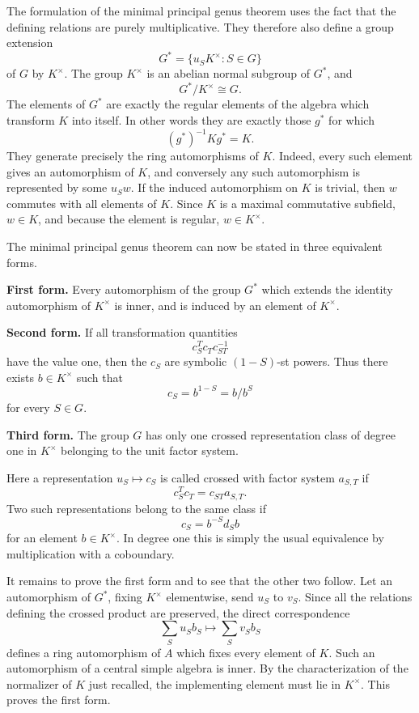 \documentclass[11pt]{article}
\begin{document}
The formulation of the minimal principal genus theorem uses the fact that the defining relations are purely multiplicative. They therefore also define a group extension
\[
  G^*=\{u_S K^{\times}: S\in G\}
\]
of \(G\) by \(K^{\times}\). The group \(K^{\times}\) is an abelian normal subgroup of \(G^*\), and
\[
  G^*/K^{\times}\cong G.
\]
The elements of \(G^*\) are exactly the regular elements of the algebra which transform \(K\) into itself. In other words they are exactly those \(g^*\) for which
\[
  (g^*)^{-1}Kg^*=K.
\]
They generate precisely the ring automorphisms of \(K\). Indeed, every such element gives an automorphism of \(K\), and conversely any such automorphism is represented by some \(u_S w\). If the induced automorphism on \(K\) is trivial, then \(w\) commutes with all elements of \(K\). Since \(K\) is a maximal commutative subfield, \(w\in K\), and because the element is regular, \(w\in K^{\times}\).

The minimal principal genus theorem can now be stated in three equivalent forms.

\textbf{First form.} Every automorphism of the group \(G^*\) which extends the identity automorphism of \(K^{\times}\) is inner, and is induced by an element of \(K^{\times}\).

\textbf{Second form.} If all transformation quantities
\[
  c_S^T c_T c_{ST}^{-1}
\]
have the value one, then the \(c_S\) are symbolic \((1-S)\)-st powers. Thus there exists \(b\in K^{\times}\) such that
\[
  c_S=b^{1-S}=b/b^S
\]
for every \(S\in G\).

\textbf{Third form.} The group \(G\) has only one crossed representation class of degree one in \(K^{\times}\) belonging to the unit factor system.

Here a representation \(u_S\mapsto c_S\) is called crossed with factor system \(a_{S,T}\) if
\[
  c_S^T c_T=c_{ST}a_{S,T}.
\]
Two such representations belong to the same class if
\[
  c_S=b^{-S}d_S b
\]
for an element \(b\in K^{\times}\). In degree one this is simply the usual equivalence by multiplication with a coboundary.

It remains to prove the first form and to see that the other two follow. Let an automorphism of \(G^*\), fixing \(K^{\times}\) elementwise, send \(u_S\) to \(v_S\). Since all the relations defining the crossed product are preserved, the direct correspondence
\[
  \sum_S u_S b_S\longmapsto \sum_S v_S b_S
\]
defines a ring automorphism of \(A\) which fixes every element of \(K\). Such an automorphism of a central simple algebra is inner. By the characterization of the normalizer of \(K\) just recalled, the implementing element must lie in \(K^{\times}\). This proves the first form.
\end{document}
